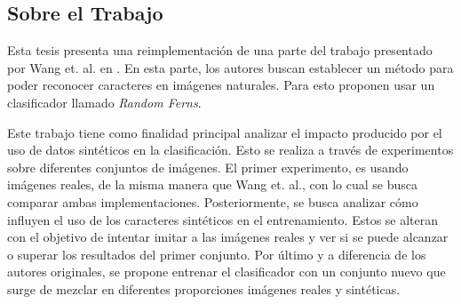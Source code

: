 \subsection{Sobre el Trabajo}

	Esta tesis presenta una reimplementación de una parte del trabajo presentado por Wang et. al. en \cite{wang}. En esta parte, los autores buscan establecer un método para poder reconocer caracteres en imágenes naturales. Para esto proponen usar un clasificador llamado \textit{Random Ferns}.
	
	Este trabajo tiene como finalidad principal analizar el impacto producido por el uso de datos sintéticos en la clasificación. Esto se realiza a través de experimentos sobre diferentes conjuntos de imágenes. El primer experimento, es usando imágenes reales, de la misma manera que Wang et. al., con lo cual se busca comparar ambas implementaciones. Posteriormente, se busca analizar cómo influyen el uso de los caracteres sintéticos en el entrenamiento. Estos se alteran con el objetivo de intentar imitar a las imágenes reales y ver si se puede alcanzar o superar los resultados del primer conjunto. Por último y a diferencia de los autores originales, se propone entrenar el clasificador con  un conjunto nuevo que surge de mezclar en diferentes proporciones imágenes reales y sintéticas.